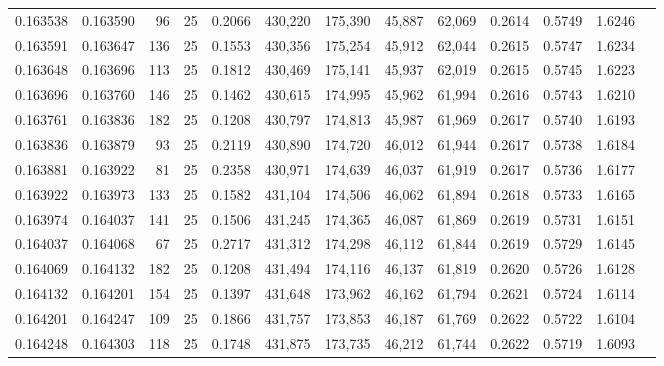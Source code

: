 \begin{tabular}{rrrrrrrrrrrrr}
0.163538 & 0.163590 &    96 &  25 &                                     0.2066 & 430,220 & 175,390 &  45,887 &  62,069 & 0.2614 & 0.5749 & 1.6246 \\
0.163591 & 0.163647 &   136 &  25 &                                     0.1553 & 430,356 & 175,254 &  45,912 &  62,044 & 0.2615 & 0.5747 & 1.6234 \\
0.163648 & 0.163696 &   113 &  25 &                                     0.1812 & 430,469 & 175,141 &  45,937 &  62,019 & 0.2615 & 0.5745 & 1.6223 \\
0.163696 & 0.163760 &   146 &  25 &                                     0.1462 & 430,615 & 174,995 &  45,962 &  61,994 & 0.2616 & 0.5743 & 1.6210 \\
0.163761 & 0.163836 &   182 &  25 &                                     0.1208 & 430,797 & 174,813 &  45,987 &  61,969 & 0.2617 & 0.5740 & 1.6193 \\
0.163836 & 0.163879 &    93 &  25 &                                     0.2119 & 430,890 & 174,720 &  46,012 &  61,944 & 0.2617 & 0.5738 & 1.6184 \\
0.163881 & 0.163922 &    81 &  25 &                                     0.2358 & 430,971 & 174,639 &  46,037 &  61,919 & 0.2617 & 0.5736 & 1.6177 \\
0.163922 & 0.163973 &   133 &  25 &                                     0.1582 & 431,104 & 174,506 &  46,062 &  61,894 & 0.2618 & 0.5733 & 1.6165 \\
0.163974 & 0.164037 &   141 &  25 &                                     0.1506 & 431,245 & 174,365 &  46,087 &  61,869 & 0.2619 & 0.5731 & 1.6151 \\
0.164037 & 0.164068 &    67 &  25 &                                     0.2717 & 431,312 & 174,298 &  46,112 &  61,844 & 0.2619 & 0.5729 & 1.6145 \\
0.164069 & 0.164132 &   182 &  25 &                                     0.1208 & 431,494 & 174,116 &  46,137 &  61,819 & 0.2620 & 0.5726 & 1.6128 \\
0.164132 & 0.164201 &   154 &  25 &                                     0.1397 & 431,648 & 173,962 &  46,162 &  61,794 & 0.2621 & 0.5724 & 1.6114 \\
0.164201 & 0.164247 &   109 &  25 &                                     0.1866 & 431,757 & 173,853 &  46,187 &  61,769 & 0.2622 & 0.5722 & 1.6104 \\
0.164248 & 0.164303 &   118 &  25 &                                     0.1748 & 431,875 & 173,735 &  46,212 &  61,744 & 0.2622 & 0.5719 & 1.6093 \\

\end{tabular}
